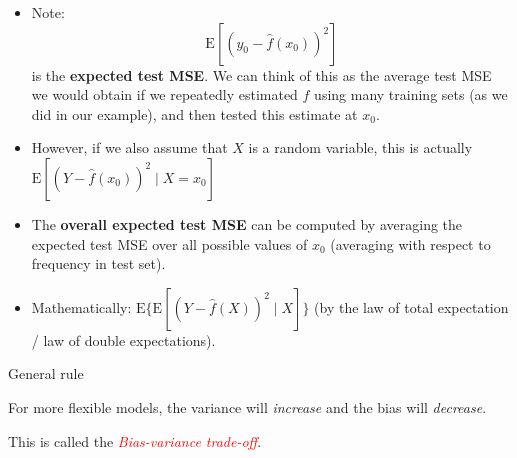 \documentclass[ignorenonframetext,]{beamer}
\begin{document}
\begin{frame}

\begin{itemize}
\item
  Note: \[\text{E}[(y_0 - \hat{f}(x_0))^2]\] is the \textbf{expected
  test MSE}. We can think of this as the average test MSE we would
  obtain if we repeatedly estimated \(f\) using many training sets (as
  we did in our example), and then tested this estimate at \(x_0\).
\item
  However, if we also assume that \(X\) is a random variable, this is
  actually \(\text{E}[(Y - \hat{f}(x_0))^2 \mid X=x_0]\)
\item
  The \textbf{overall expected test MSE} can be computed by averaging
  the expected test MSE over all possible values of \(x_0\) (averaging
  with respect to frequency in test set).
\item
  Mathematically: \(\text{E} \{ \text{E}[(Y - \hat{f}(X))^2 \mid X]\}\)
  (by the law of total expectation / law of double expectations).
\end{itemize}

\end{frame}

\begin{frame}

\begin{block}{General rule}

\vspace{4mm}

For more flexible models, the variance will \emph{increase} and the bias
will \emph{decrease}.

\vspace{4mm}

\centering

This is called the \emph{\textcolor{red}{Bias-variance trade-off}}.

\end{block}

\end{frame}
\end{document}
